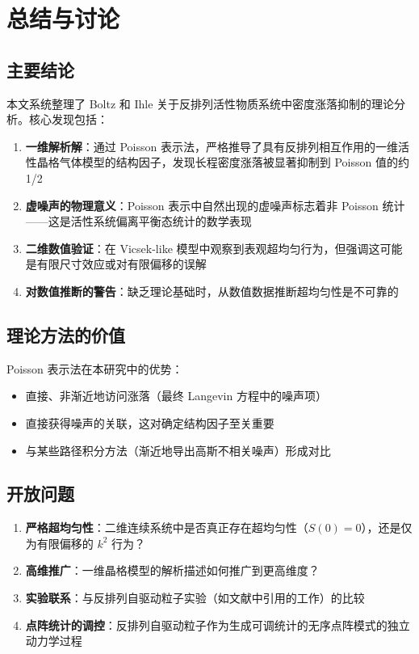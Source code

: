 
\section{总结与讨论}\label{sec:conclusion}

\subsection{主要结论}

本文系统整理了 Boltz 和 Ihle 关于反排列活性物质系统中密度涨落抑制的理论分析。核心发现包括：

\begin{enumerate}
    \item \textbf{一维解析解}：通过 Poisson 表示法，严格推导了具有反排列相互作用的一维活性晶格气体模型的结构因子，发现长程密度涨落被显著抑制到 Poisson 值的约 1/2
    
    \item \textbf{虚噪声的物理意义}：Poisson 表示中自然出现的虚噪声标志着非 Poisson 统计——这是活性系统偏离平衡态统计的数学表现
    
    \item \textbf{二维数值验证}：在 Vicsek-like 模型中观察到表观超均匀行为，但强调这可能是有限尺寸效应或对有限偏移的误解
    
    \item \textbf{对数值推断的警告}：缺乏理论基础时，从数值数据推断超均匀性是不可靠的
\end{enumerate}

\subsection{理论方法的价值}

Poisson 表示法在本研究中的优势：
\begin{itemize}
    \item 直接、非渐近地访问涨落（最终 Langevin 方程中的噪声项）
    \item 直接获得噪声的关联，这对确定结构因子至关重要
    \item 与某些路径积分方法（渐近地导出高斯不相关噪声）形成对比
\end{itemize}

\subsection{开放问题}

\begin{enumerate}
    \item \textbf{严格超均匀性}：二维连续系统中是否真正存在超均匀性（$S(0) = 0$），还是仅为有限偏移的 $k^2$ 行为？
    \item \textbf{高维推广}：一维晶格模型的解析描述如何推广到更高维度？
    \item \textbf{实验联系}：与反排列自驱动粒子实验（如文献\cite{boltz2025}中引用的工作）的比较
    \item \textbf{点阵统计的调控}：反排列自驱动粒子作为生成可调统计的无序点阵模式的独立动力学过程
\end{enumerate}

